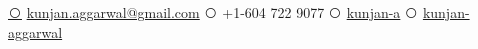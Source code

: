 \documentclass[letterpaper]{style} %
\def\ci#1{\textcircled{\resizebox{.5em}{!}{#1}}}
\begin{document}

{
\href{mailto:kunjan.aggarwal@gmail.com}{\ci{\faEnvelope}} {\fontsize{10}{10}\selectfont \href{mailto:kunjan.aggarwal@gmail.com}{kunjan.aggarwal@gmail.com}}}
{
\ci{\faPhone}  {\fontsize{10}{10}\selectfont +1-604 722 9077} 
}
{
\href{https://github.com/kunjan-a}{\ci{\faGithub}} {\fontsize{10}{10}\selectfont \href{https://github.com/kunjan-a}{kunjan-a}}
}
{
\href{https://www.linkedin.com/in/kunjan-aggarwal}{\ci{\faLinkedin}} {\fontsize{10}{10}\selectfont \href{https://www.linkedin.com/in/kunjan-aggarwal}{kunjan-aggarwal}}
}



%
\end{document}
